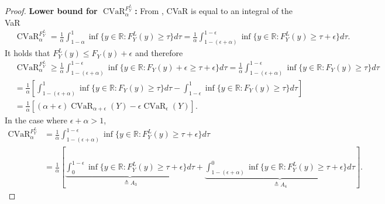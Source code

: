 \documentclass[acmlarge, manuscript, screen, review, natbib=false, oneside]{acmart}
\DeclareMathOperator{\CVaR}{CVaR}
\begin{document}
\begin{proof}
	\textbf{Lower bound for $\CVaR_\alpha^{F_Y^L}$:} From \cite{acerbi2002coherence}, CVaR is equal to an integral of the VaR
	\begin{equation}
		\begin{aligned}
			&\CVaR_\alpha^{F_Y^L}=\frac{1}{\alpha}\int_{1-\alpha}^1 \inf \{y\in \mathbb{R}:F_Y^L(y)\geq \tau\} d\tau 
			=\frac{1}{\alpha}\int_{1-(\epsilon+\alpha)}^{1-\epsilon} \inf \{y\in \mathbb{R}:F_Y^L(y)\geq \tau +\epsilon\} d\tau.
		\end{aligned}
	\end{equation}
	It holds that $F_Y^L(y)\leq F_Y(y)+\epsilon$ and therefore
	\begin{equation}
		\begin{aligned}
			&\CVaR_\alpha^{F_Y^L} \geq \frac{1}{\alpha}\int_{1-(\epsilon+\alpha)}^{1-\epsilon} \inf \{y\in \mathbb{R}:F_Y(y)+\epsilon \geq \tau +\epsilon\} d\tau 
			=\frac{1}{\alpha}\int_{1-(\epsilon+\alpha)}^{1-\epsilon} \inf \{y\in \mathbb{R}:F_Y(y)\geq \tau\} d\tau \\
			&=\frac{1}{\alpha}[\int_{1-(\epsilon+\alpha)}^{1} \inf \{y\in \mathbb{R}:F_Y(y)\geq \tau\} d\tau 
			-\int_{1-\epsilon}^{1} \inf \{y\in \mathbb{R}:F_Y(y)\geq \tau\} d\tau] \\
			&=\frac{1}{\alpha}[(\alpha+\epsilon)\CVaR_{\alpha+\epsilon}(Y)-\epsilon \CVaR_{\epsilon}(Y)].
		\end{aligned}
	\end{equation}
	In the case where $\epsilon+\alpha > 1$,
	\begin{equation}
		\begin{aligned}
			\CVaR_\alpha^{F_Y^L}&=\frac{1}{\alpha}\int_{1-(\epsilon+\alpha)}^{1-\epsilon} \inf \{y\in \mathbb{R}:F_Y^L(y)\geq \tau +\epsilon\} d\tau \\
			&=\frac{1}{\alpha}[\underbrace{\int_{0}^{1-\epsilon} \inf \{y\in \mathbb{R}:F_Y^L(y)\geq \tau +\epsilon\} d\tau}_{\triangleq A_3} 
			+\underbrace{\int_{1-(\epsilon+\alpha)}^{0} \inf \{y\in \mathbb{R}:F_Y^L(y)\geq \tau +\epsilon\} d\tau}_{\triangleq A_4}].
		\end{aligned}
	\end{equation}
	

\end{proof}
\end{document}

